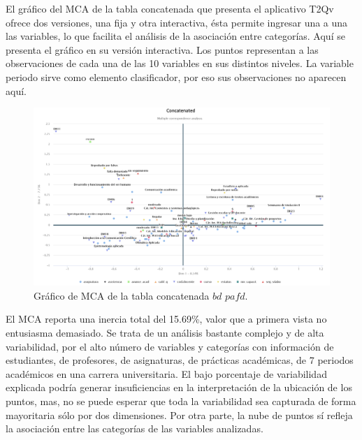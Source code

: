 \documentclass[mathematics,article,submit,moreauthors,pdftex]{mdpi}
\begin{document}
El gráfico del MCA de la tabla concatenada que presenta el aplicativo
T2Qv ofrece dos versiones, una fija y otra interactiva, ésta permite
ingresar una a una las variables, lo que facilita el análisis de la
asociación entre categorías. Aquí se presenta el gráfico en su versión
interactiva. Los puntos representan a las observaciones de cada una de
las 10 variables en sus distintos niveles. La variable periodo sirve
como elemento clasificador, por eso sus observaciones no aparecen aquí.

\begin{figure}[H]


\begin{center}\includegraphics[width=0.9\linewidth,]{concat_edu} \end{center}

\caption{Gráfico de MCA de la tabla concatenada $bd$ $pafd$.}
\label{fig:concatedu}
\end{figure}

El MCA reporta una inercia total del 15.69\%, valor que a primera vista
no entusiasma demasiado. Se trata de un análisis bastante complejo y de
alta variabilidad, por el alto número de variables y categorías con
información de estudiantes, de profesores, de asignaturas, de prácticas
académicas, de 7 periodos académicos en una carrera universitaria. El
bajo porcentaje de variabilidad explicada podría generar insuficiencias
en la interpretación de la ubicación de los puntos, mas, no se puede
esperar que toda la variabilidad sea capturada de forma mayoritaria sólo
por dos dimensiones. Por otra parte, la nube de puntos sí refleja la
asociación entre las categorías de las variables analizadas.
\end{document}
